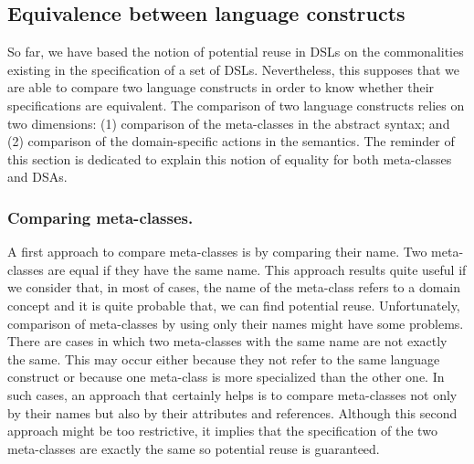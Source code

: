 \subsection{Equivalence between language constructs}

So far, we have based the notion of potential reuse in DSLs on the commonalities existing in the specification of a set of DSLs. Nevertheless, this supposes that we are able to compare two language constructs in order to know whether their specifications are equivalent. The comparison of two language constructs relies on two dimensions: (1) comparison of the meta-classes in the abstract syntax; and (2) comparison of the domain-specific actions in the semantics. The reminder of this section is dedicated to explain this notion of equality for both meta-classes and DSAs.

\vspace{-2mm}
\subsubsection{Comparing meta-classes.} A first approach to compare meta-classes is by comparing their name. Two meta-classes are equal if they have the same name. This approach results quite useful if we consider that, in most of cases, the name of the meta-class refers to a domain concept and it is quite probable that, we can find potential reuse. Unfortunately, comparison of meta-classes by using only their names might have some problems. There are cases in which two meta-classes with the same name are not exactly the same. This may occur either because they not refer to the same language construct or because one meta-class is more specialized than the other one. In such cases, an approach that certainly helps is to compare meta-classes not only by their names but also by their attributes and references. Although this second approach might be too restrictive, it implies that the specification of the two meta-classes are exactly the same so potential reuse is guaranteed.

\vspace{-2mm}
